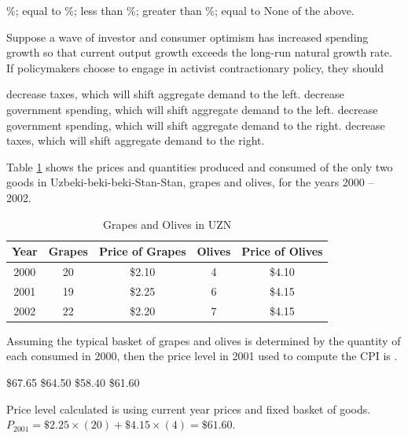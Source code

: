 \documentclass[addpoints,11pt]{exam}
\theoremstyle{definition}
\newcommand{\blank}[0]{\underline{\hspace{3cm}}}
\begin{document}
\begin{questions}
\begin{choices}
\%; equal to
\%; less than
\%; greater than
\%; equal to
\choice None of the above.
\end{choices}

\question Suppose a wave of investor and consumer optimism has increased spending growth so that current output growth exceeds the long-run natural growth rate. If policymakers choose to engage in activist contractionary policy, they should

\begin{choices}
	\choice decrease taxes, which will shift aggregate demand to the left.
	\CorrectChoice decrease government spending, which will shift aggregate demand to the left.
	\choice decrease government spending, which will shift aggregate demand to the right.
	\choice decrease taxes, which will shift aggregate demand to the right.
\end{choices} 

\question Table \ref{MC43} shows the prices and quantities produced and consumed of the only two goods in Uzbeki-beki-beki-Stan-Stan, grapes and olives, for the years 2000 -- 2002.

\begin{table}[h!]
	\caption{Grapes and Olives in UZN}
	\centering
	\begin{tabular}{c|c|c|c|c}
		Year & Grapes  & Price of Grapes & Olives & Price of Olives \\
		\hline
		2000 & 20 & \$2.10 & 4 & \$4.10\\
		2001 & 19 & \$2.25 & 6 & \$4.15\\
		2002 & 22 & \$2.20 & 7 & \$4.15\\
	\end{tabular} 
	\label{MC43}
\end{table}

Assuming the typical basket of grapes and olives is determined by the quantity of each consumed in 2000, then the price level in 2001 used to compute the CPI is \blank.

\begin{choices}
	\choice \$67.65
	\choice \$64.50
	\choice \$58.40
	\CorrectChoice \$61.60
\end{choices}

\begin{solution}
	Price level calculated is using current year prices and fixed basket of goods.\\
	$P_{2001} = \$2.25\times(20) + \$4.15\times(4) = \$61.60$.
\end{solution}


\end{questions}
\end{document}
